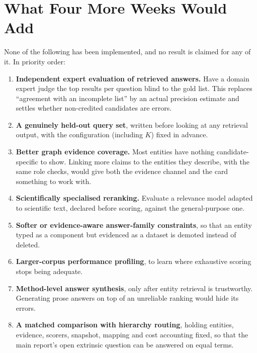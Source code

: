 \documentclass[11pt,a4paper]{article}
\theoremstyle{remark}
\begin{document}
\section{What Four More Weeks Would Add}
\label{sec:future}

None of the following has been implemented, and no result is claimed for any of it. In
priority order:

\begin{enumerate}
  \item \textbf{Independent expert evaluation of retrieved answers.} Have a domain expert
        judge the top results per question blind to the gold list. This replaces
        ``agreement with an incomplete list'' by an actual precision estimate and settles
        whether non-credited candidates are errors.
  \item \textbf{A genuinely held-out query set}, written before looking at any retrieval
        output, with the configuration (including $K$) fixed in advance.
  \item \textbf{Better graph evidence coverage.} Most entities have nothing
        candidate-specific to show. Linking more claims to the entities they describe,
        with the same role checks, would give both the evidence channel and the card
        something to work with.
  \item \textbf{Scientifically specialised reranking.} Evaluate a relevance model adapted
        to scientific text, declared before scoring, against the general-purpose one.
  \item \textbf{Softer or evidence-aware answer-family constraints}, so that an entity
        typed as a component but evidenced as a dataset is demoted instead of deleted.
  \item \textbf{Larger-corpus performance profiling}, to learn where exhaustive scoring
        stops being adequate.
  \item \textbf{Method-level answer synthesis}, only after entity retrieval is
        trustworthy. Generating prose answers on top of an unreliable ranking would hide
        its errors.
  \item \textbf{A matched comparison with hierarchy routing}, holding entities, evidence,
        scorers, snapshot, mapping and cost accounting fixed, so that the main report's
        open extrinsic question can be answered on equal terms.
\end{enumerate}
\end{document}
